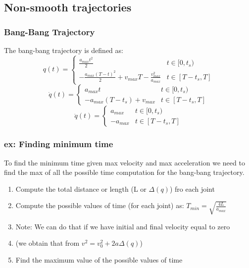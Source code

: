 \documentclass[a4paper,12pt]{article}
\begin{document}
\subsection{Non-smooth trajectories}
\subsubsection{Bang-Bang Trajectory}
The bang-bang trajectory is defined as:
\begin{equation}
    q(t) = \begin{cases}
        \frac{a_{max}t^2}{2} & t \in [0,t_s)\\
        -\frac{a_{max}(T-t)^2}{2}+v_{max}T -\frac{v^2_{max}}{a_{max}} & t \in [T-t_s,T]
    \end{cases}
\end{equation}
\begin{equation}
    \dot{q}(t) = \begin{cases}
        a_{max}t & t \in [0,t_s)\\
        -a_{max}(T-t_s)+v_{max} & t \in [T-t_s,T]
    \end{cases}
\end{equation}
\begin{equation}
    \ddot{q}(t) = \begin{cases}
        a_{max} & t \in [0,t_s)\\
        -a_{max} & t \in [T-t_s,T]
    \end{cases}
\end{equation}
\subsubsection{ex: Finding minimum time}
To find the minimum time given max velocity and max acceleration we need to find the max
of all the possible time computation for the bang-bang trajectory.
\begin{enumerate}
    \item Compute the total distance or length (L or $\Delta(q)$) fro each joint
    \item Compute the possible values of time (for each joint) as:
            $T_{min} = \sqrt{\frac{4L}{a_{max}}}$
    \item Note: We can do that if we have initial and final velocity equal to zero
    \item (we obtain that from $v^2=v^2_0+2a\Delta(q)$)
    \item Find the maximum value of the possible values of time
\end{enumerate}
\end{document}
